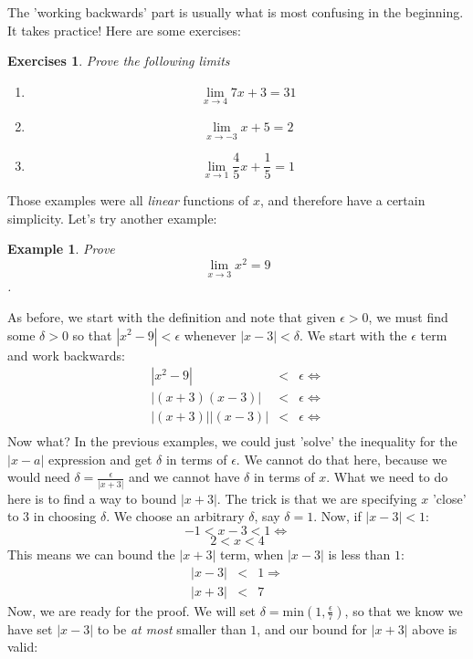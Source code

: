 \documentclass[12pt,a4paper]{article} %
\newtheorem{example}{Example}
\newtheorem{exer}{Exercises}
\begin{document}
The 'working backwards' part is usually what is most confusing in the beginning.  It takes practice!  Here are some exercises:
\begin{exer}
Prove the following limits
\begin{enumerate}
\item $$\lim_{x\rightarrow 4} 7x+3=31$$
\item $$\lim_{x\rightarrow -3} x+5 =2$$
\item $$\lim_{x\rightarrow 1}{\frac{4}{5}x +\frac15=1}$$
\end{enumerate}
\end{exer}
Those examples were all \emph{linear} functions of $x$, and therefore have a certain simplicity.  Let's try another example:
\begin{example}
Prove $$\lim_{x\rightarrow 3} x^2 =9$$.
\end{example}
As before, we start with the definition and note that given $\epsilon>0$, we must find some $\delta>0$ so that $|x^2-9|<\epsilon$ whenever $|x-3|<\delta$.  We start with the $\epsilon$ term and work backwards:
\begin{eqnarray*}
|x^2-9|&<&\epsilon\iff\\
|(x+3)(x-3)|&<&\epsilon\iff\\
|(x+3)||(x-3)|&<&\epsilon\iff\\
\end{eqnarray*}
Now what?  In the previous examples, we could just 'solve' the inequality for the $|x-a|$ expression and get $\delta$ in terms of $\epsilon$.  We cannot do that here, because we would need $\delta=\frac{\epsilon}{|x+3|}$ and we cannot have $\delta$ in terms of $x$.  What we need to do here is to find a way to bound $|x+3|$.  The trick is that we are specifying $x$ 'close' to $3$ in choosing $\delta$.  We choose an arbitrary $\delta$, say $\delta=1$.  Now, if $|x-3|<1$:
\begin{equation*}
-1<x-3 <1 \iff
\end{equation*}
\begin{equation*}
 2<x   <4
\end{equation*}    
This means we can bound the $|x+3|$ term, when $|x-3|$ is less than $1$:
\begin{eqnarray*}
|x-3| &<& 1\Rightarrow\\
|x+3| &<& 7 
\end{eqnarray*}
Now, we are ready for the proof. We will set $\delta =\mathrm{min}\left(1,\frac{\epsilon}{7}\right)$, so that we know we have set $|x-3|$ to be \emph{at most} smaller than $1$, and our bound for $|x+3|$ above is valid:
\end{document}
